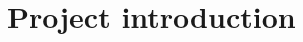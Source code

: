 \documentclass[xcolor={x11names}]{beamer}
\begin{document}
%
%


%
%
%

\section{Project introduction}

\end{document}
